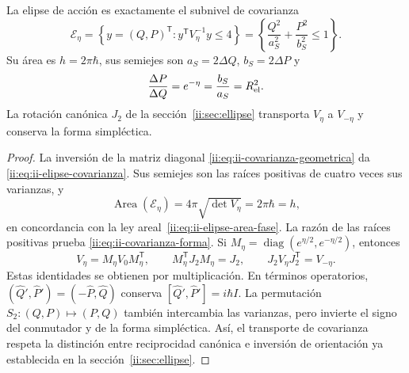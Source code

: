 \begin{proposition}
\label{ii:prop:ii-area-covarianza-reciprocidad}
La elipse de acción es exactamente el subnivel de covarianza
\begin{equation}
 \mathcal E_\eta
 =\left\{y=(Q,P)^{\mathsf T}:y^{\mathsf T}V_\eta^{-1}y\leq4\right\}
 =\left\{\frac{Q^2}{a_S^2}+\frac{P^2}{b_S^2}\leq1\right\}.
 \label{ii:eq:ii-elipse-covarianza}
\end{equation}
Su área es \(h=2\pi\hbar\), sus semiejes son
\(a_S=2\Delta Q\), \(b_S=2\Delta P\) y
\begin{equation}
 \frac{\Delta P}{\Delta Q}=e^{-\eta}
 =\frac{b_S}{a_S}=R_{\rm el}^2.
 \label{ii:eq:ii-covarianza-forma}
\end{equation}
La rotación canónica \(J_2\) de la sección~\ref{ii:sec:ellipse} transporta
\(V_\eta\) a \(V_{-\eta}\) y conserva la forma simpléctica.
\end{proposition}

\begin{proof}
La inversión de la matriz diagonal
\eqref{ii:eq:ii-covarianza-geometrica} da
\eqref{ii:eq:ii-elipse-covarianza}. Sus semiejes son las raíces positivas de
cuatro veces sus varianzas, y
\[
 \operatorname{Area}(\mathcal E_\eta)
 =4\pi\sqrt{\det V_\eta}=2\pi\hbar=h,
\]
en concordancia con la ley areal~\eqref{ii:eq:ii-elipse-area-fase}.
La razón de las raíces positivas prueba
\eqref{ii:eq:ii-covarianza-forma}.
Si \(M_\eta=\operatorname{diag}(e^{\eta/2},e^{-\eta/2})\), entonces
\[
 V_\eta=M_\eta V_0M_\eta^{\mathsf T},\qquad
 M_\eta^{\mathsf T}J_2M_\eta=J_2,\qquad
 J_2V_\eta J_2^{\mathsf T}=V_{-\eta}.
\]
Estas identidades se obtienen por multiplicación. En términos operatorios,
\((\widehat Q',\widehat P')=(-\widehat P,\widehat Q)\) conserva
\([\widehat Q',\widehat P']=i\hbar I\). La permutación
\(S_2:(Q,P)\mapsto(P,Q)\) también intercambia las varianzas, pero invierte
el signo del conmutador y de la forma simpléctica. Así, el transporte de
covarianza respeta la distinción entre reciprocidad canónica e inversión
de orientación ya establecida en la sección~\ref{ii:sec:ellipse}.
\end{proof}

